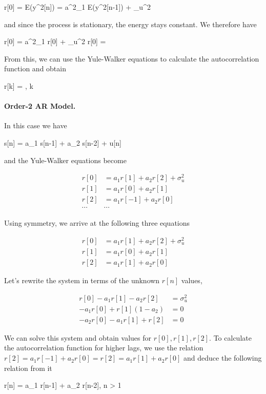 \bee
r[0] = E(y^2[n]) = a^2_1 E(y^2[n-1]) + \sigma_u^2
\eee

and since the process is stationary, the energy stays constant. We therefore have

\bee
r[0] = a^2_1 r[0] + \sigma_u^2 \rightarrow r[0] = 
\eee

From this, we can use the Yule-Walker equations to calculate the autocorrelation function and obtain

\bee
r[k] = , \qquad k 
\eee


\paragraph{Order-2 AR Model.} In this case we have

\bee
s[n] = a_1 s[n-1] + a_2 s[n-2] + u[n]
\eee


and the Yule-Walker equations become

\begin{align*}
r[0] &= a_1 r[1] + a_2 r[2] + \sigma_u^2 \\
r[1] &= a_1 r[0] + a_2 r[1] \\
r[2] &= a_1 r[-1] + a_2 r[0] \\
\cdots & \cdots
\end{align*}

Using symmetry, we arrive at the following three equations

\begin{align*}
r[0] &= a_1 r[1] + a_2 r[2] + \sigma_u^2 \\
r[1] &= a_1 r[0] + a_2 r[1] \\
r[2] &= a_1 r[1] + a_2 r[0]
\end{align*}

Let's rewrite the system in terms of the unknown $r[n]$ values,

\begin{align*}
r[0] - a_1 r[1] - a_2 r[2] &= \sigma_u^2 \\
-a_1 r[0] + r[1] (1- a_2) &= 0 \\
- a_2 r[0] - a_1 r[1] + r[2] &= 0
\end{align*}

We can solve this system and obtain values for $r[0], r[1], r[2]$. To calculate the autocorrelation function for higher lags, we use the relation $r[2] = a_1 r[-1] + a_2 r[0] = r[2] = a_1 r[1] + a_2 r[0]$ and deduce the following relation from it

\bee
r[n] = a_1 r[n-1] + a_2 r[n-2], \qquad n > 1
\eee

